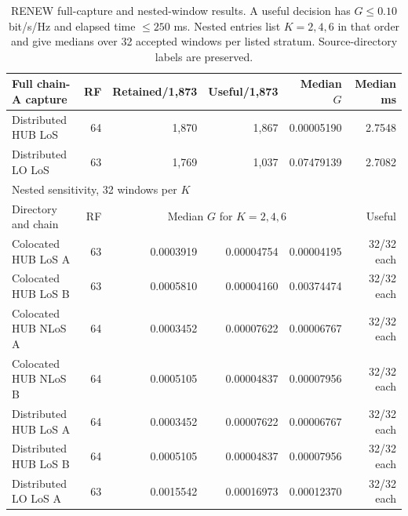 \documentclass[10pt,letterpaper]{article}
\begin{document}
\begin{table}[htbp]
\centering\small
\caption{RENEW full-capture and nested-window results. A useful decision has
$G\leq0.10$ bit/s/Hz and elapsed time $\leq250$ ms. Nested entries list
$K=2,4,6$ in that order and give medians over 32 accepted windows per listed
stratum. Source-directory labels are preserved.}
\label{supp:table8}
\begin{tabular}{lrrrrr}
\hline
Full chain-A capture & RF & Retained/1,873 & Useful/1,873 & Median $G$ & Median ms\\
\hline
Distributed HUB LoS &64&1,870&1,867&0.00005190&2.7548\\
Distributed LO LoS &63&1,769&1,037&0.07479139&2.7082\\
\hline
\multicolumn{6}{l}{Nested sensitivity, 32 windows per $K$}\\
Directory and chain & RF & \multicolumn{3}{c}{Median $G$ for $K=2,4,6$} & Useful\\
\hline
Colocated HUB LoS A &63&0.0003919&0.00004754&0.00004195&32/32 each\\
Colocated HUB LoS B &63&0.0005810&0.00004160&0.00374474&32/32 each\\
Colocated HUB NLoS A &64&0.0003452&0.00007622&0.00006767&32/32 each\\
Colocated HUB NLoS B &64&0.0005105&0.00004837&0.00007956&32/32 each\\
Distributed HUB LoS A &64&0.0003452&0.00007622&0.00006767&32/32 each\\
Distributed HUB LoS B &64&0.0005105&0.00004837&0.00007956&32/32 each\\
Distributed LO LoS A &63&0.0015542&0.00016973&0.00012370&32/32 each\\
\hline
\end{tabular}
\end{table}
\end{document}
